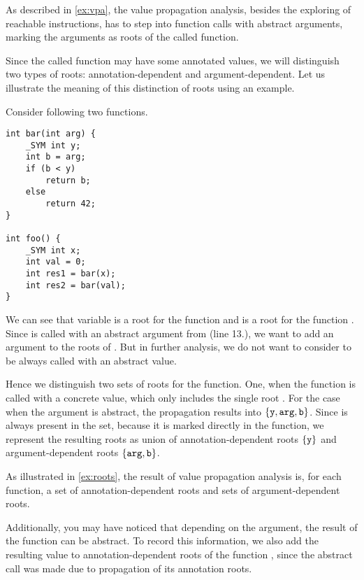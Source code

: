As described in \autoref{ex:vpa}, the value propagation analysis, besides
the exploring of reachable instructions, has to step into function calls with
abstract arguments, marking the arguments as roots of the called function.

Since the called function may have some annotated values, we will distinguish
two types of roots: annotation-dependent and argument-dependent. Let us
illustrate the meaning of this distinction of roots using an example.

\begin{example} \label{ex:roots} Consider following two functions.
    \begin{verbatim}
int bar(int arg) {
    _SYM int y;
    int b = arg;
    if (b < y)
        return b;
    else
        return 42;
}

int foo() {
    _SYM int x;
    int val = 0;
    int res1 = bar(x);
    int res2 = bar(val);
}
\end{verbatim}
    We can see that variable  is a root for the function  and
     is a root for the function . Since  is called
    with an abstract argument from  (line 13.), we want to add an
    argument  to the roots of . But in further analysis, we
    do not want to consider  to be always called with an abstract
    value.

    Hence we distinguish two sets of roots for the  function. One,
    when the function is called with a concrete value, which only includes the
    single root . For the case when the argument is abstract, the
    propagation results into $\{\texttt{y}, \texttt{arg}, \texttt{b}\}$. Since
     is always present in the set, because it is marked directly in the
    function, we represent the resulting roots as union of annotation-dependent
    roots $\{\texttt{y}\}$ and argument-dependent roots $\{\texttt{arg},
    \texttt{b}\}$.
\end{example}

As illustrated in \autoref{ex:roots}, the result of value propagation analysis
is, for each function, a set of annotation-dependent roots and sets of
argument-dependent roots.

Additionally, you may have noticed that depending on the
argument, the result of the function  can be abstract. To record this
information, we also add the resulting value  to anno\-tation-dependent
roots of the function , since the abstract call was made due to
propagation of its annotation roots.

